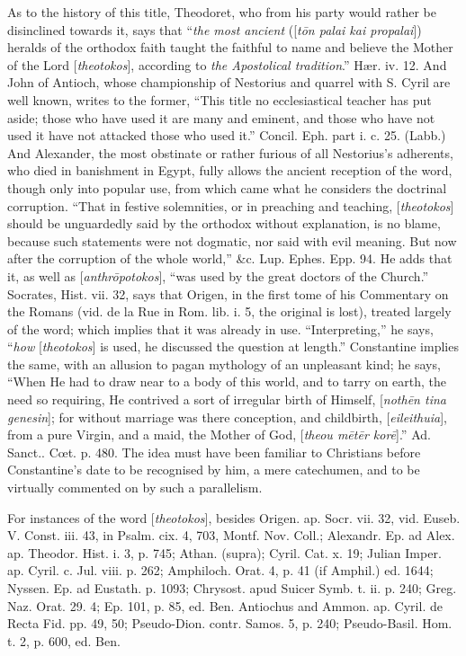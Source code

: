 As to the history of this title, Theodoret, who
from his party would rather be disinclined towards it, says that ``\emph{the
most ancient} ([\emph{t\={o}n palai kai propalai}]) heralds of
the orthodox faith taught the faithful to name and believe the Mother
of the Lord [\emph{theotokos}], according to \emph{the Apostolical
tradition}.'' Hær. iv. 12. And John of Antioch, whose championship
of Nestorius and quarrel with S. Cyril are well known, writes to
the former, ``This title no ecclesiastical teacher has put aside; those
who have used it are many and eminent, and those who have not used it
have not attacked those who used it.'' Concil. Eph. part i. c. 25. (Labb.)
And Alexander, the most obstinate or rather furious of all Nestorius's
adherents, who died in banishment in Egypt, fully allows the ancient
reception of the word, though only into popular use, from which came
what he considers the doctrinal corruption. ``That in festive
solemnities, or in preaching and teaching, [\emph{theotokos}] should
be unguardedly said by the orthodox without explanation, is no blame,
because such statements were not dogmatic, nor said with evil meaning.
But now after the corruption of the whole world,'' \&c. Lup. Ephes.
Epp. 94. He adds that it, as well as [\emph{anthr\={o}potokos}], ``was
used by the great doctors of the Church.'' Socrates, Hist. vii. 32,
says that Origen, in the first tome of his Commentary on the Romans (vid.
de la Rue in Rom. lib. i. 5, the original is lost), treated largely of
the word; which implies that it was already in use. ``Interpreting,'' he
says, ``\emph{how} [\emph{theotokos}] is used, he discussed the
question at length.'' Constantine implies the same, with an allusion to
pagan mythology of an unpleasant kind; he says, ``When He had to draw
near to a body of this world, and to tarry on earth, the need so
requiring, He contrived a sort of irregular birth of Himself, [\emph{noth\={e}n
tina genesin}]; for without marriage was there conception, and
childbirth, [\emph{eileithuia}], from a pure Virgin, and a maid, the
Mother of God, [\emph{theou m\={e}t\={e}r kor\={e}}].'' Ad.
Sanct.. Cœt. p. 480. The idea must have been familiar to Christians before Constantine's date to be recognised by him, a mere
catechumen, and to be virtually commented on by such a parallelism.

For instances of the word [\emph{theotokos}],
besides Origen. ap. Socr. vii. 32, vid. Euseb. V. Const. iii. 43, in
Psalm. cix. 4, 703, Montf. Nov. Coll.; Alexandr. Ep. ad Alex. ap.
Theodor. Hist. i. 3, p. 745; Athan. (supra); Cyril. Cat. x. 19; Julian
Imper. ap. Cyril. c. Jul. viii. p. 262; Amphiloch. Orat. 4, p. 41 (if
Amphil.) ed. 1644; Nyssen. Ep. ad Eustath. p. 1093; Chrysost. apud
Suicer Symb. t. ii. p. 240; Greg. Naz. Orat. 29. 4; Ep. 101, p. 85,
ed. Ben. Antiochus and Ammon. ap. Cyril. de Recta Fid. pp. 49, 50;
Pseudo-Dion. contr. Samos. 5, p. 240; Pseudo-Basil. Hom. t. 2, p. 600,
ed. Ben.

